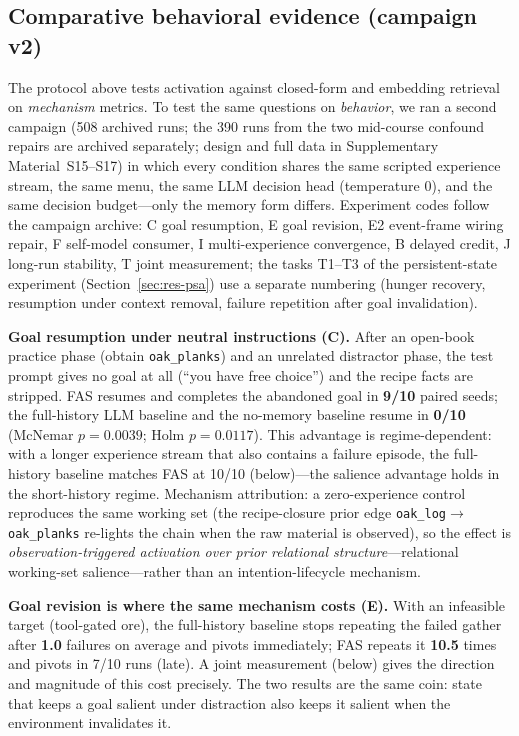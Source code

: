 \documentclass[10pt,a4paper]{article}
\begin{document}
\subsection{Comparative behavioral evidence (campaign v2)}
\label{sec:res-campaign}

The protocol above tests activation against closed-form and embedding
retrieval on \emph{mechanism} metrics. To test the same questions on
\emph{behavior}, we ran a second campaign (508 archived runs; the 390
runs from the two mid-course confound repairs are archived
separately; design and full data in Supplementary
Material~S15--S17) in which every condition shares the same scripted
experience stream, the same menu, the same LLM decision head
(temperature 0), and the same decision budget---only the memory form differs. Experiment codes follow the campaign archive: C goal resumption, E goal revision, E2 event-frame wiring repair, F self-model consumer, I multi-experience convergence, B delayed credit, J long-run stability, T joint measurement; the tasks T1--T3 of the persistent-state experiment (Section~\ref{sec:res-psa}) use a separate numbering (hunger recovery, resumption under context removal, failure repetition after goal invalidation).

\textbf{Goal resumption under neutral instructions (C).} After an
open-book practice phase (obtain \texttt{oak\_planks}) and an unrelated
distractor phase, the test prompt gives no goal at all
(``you have free choice'') and the recipe facts are stripped. FAS
resumes and completes the abandoned goal in \textbf{9/10} paired seeds;
the full-history LLM baseline and the no-memory baseline resume in
\textbf{0/10} (McNemar $p{=}0.0039$; Holm $p{=}0.0117$). This advantage
is regime-dependent: with a longer experience stream that also contains
a failure episode, the full-history baseline matches FAS at 10/10
(below)---the salience advantage holds in the short-history regime.
Mechanism attribution: a zero-experience control reproduces the
same working set (the recipe-closure prior edge
\texttt{oak\_log}$\rightarrow$\texttt{oak\_planks} re-lights the chain
when the raw material is observed), so the effect is
\emph{observation-triggered activation over prior relational
structure}---relational working-set salience---rather than an
intention-lifecycle mechanism.

\textbf{Goal revision is where the same mechanism costs (E).} With an
infeasible target (tool-gated ore), the full-history baseline stops
repeating the failed gather after \textbf{1.0} failures on average and
pivots immediately; FAS repeats it \textbf{10.5} times and pivots in
7/10 runs (late). A joint measurement (below) gives the direction and
magnitude of this cost precisely. The two results are the same coin: state that keeps
a goal salient under distraction also keeps it salient when the
environment invalidates it.
\end{document}
